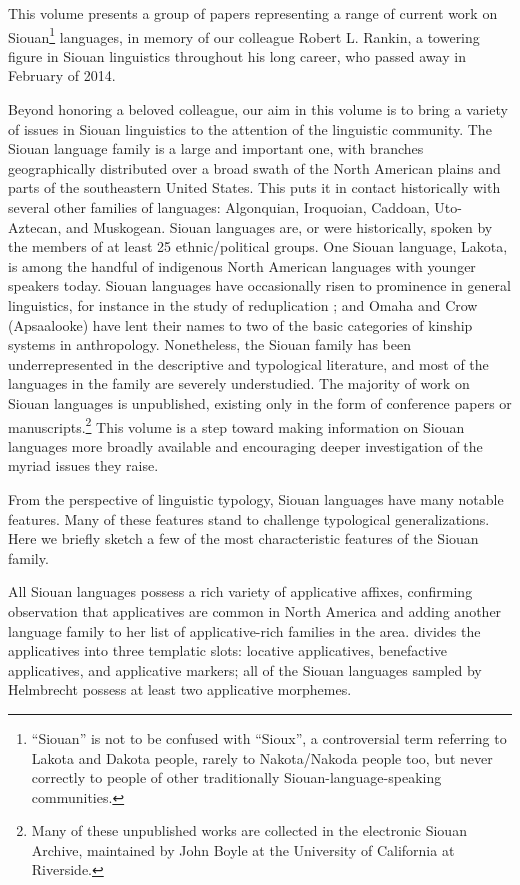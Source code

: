 \begin{refsection}

This volume presents a group of papers representing a range of current work on Siouan\footnote{``Siouan'' is not to be confused with ``Sioux'', a controversial term referring to Lakota and Dakota people, rarely to Nakota/Nakoda people too, but never correctly to people of other traditionally Siouan-language-speaking communities.} languages, in memory of our colleague Robert L. Rankin, a towering figure in Siouan linguistics throughout his long career, who passed away in February of 2014.


Beyond honoring a beloved colleague, our aim in this volume is to bring a variety of issues in Siouan linguistics to the attention of the linguistic community. The Siouan language family is a large and important one, with branches geographically distributed over a broad swath of the North American plains and parts of the southeastern United States. This puts it in contact historically with several other families of languages: Algonquian, Iroquoian, Caddoan, Uto-Aztecan, and Muskogean. Siouan languages are, or were historically, spoken by the members of at least 25 ethnic/political groups. One Siouan language, Lakota, is among the handful of indigenous North American languages with younger speakers today. Siouan languages have occasionally risen to prominence in general linguistics, for instance in the study of reduplication \citep{Shaw1980}; and Omaha and Crow (Apsaalooke) have lent their names to two of the basic categories of kinship systems in anthropology. Nonetheless, the Siouan family has been underrepresented in the descriptive and typological literature, and most of the languages in the family are severely understudied. The majority of work on Siouan languages is unpublished, existing only in the form of conference papers or manuscripts.\footnote{Many of these unpublished works are collected in the electronic Siouan Archive, maintained by John Boyle at the University of California at Riverside.} This volume is a step toward making information on Siouan languages more broadly available and encouraging deeper investigation of the myriad issues they raise.


From the perspective of linguistic typology, Siouan languages have many notable features. Many of these features stand to challenge typological generalizations. Here we briefly sketch a few of the most characteristic features of the Siouan family.


All Siouan languages possess a rich variety of applicative affixes, confirming  observation that applicatives are common in North America and adding another language family to her list of applicative-rich families in the area. \citet{Helmbrecht2006} divides the applicatives into three templatic slots: locative applicatives, benefactive applicatives, and applicative markers; all of the Siouan languages sampled by Helmbrecht possess at least two applicative morphemes.



\end{refsection}
